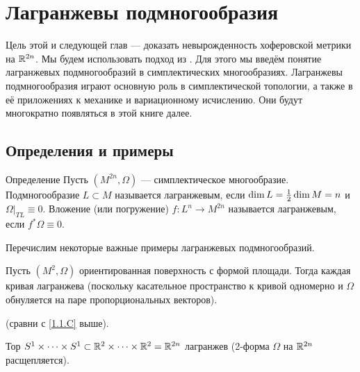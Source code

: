 \chapter{Лагранжевы подмногообразия}\label{chap:3}

Цель этой и следующей глав --- доказать невырожденность хоферовской метрики на $\mathbb{R}^{2n}$.
Мы будем использовать подход из \cite{P1}.
Для этого мы введём понятие лагранжевых подмногообразий в симплектических многообразиях.
Лагранжевы подмногообразия играют основную роль в симплектической топологии, а также в её приложениях к механике и вариационному исчислению.
Они будут многократно появляться в этой книге далее.

\section{Определения и примеры}\label{3.1}

\begin{thm*}{Определение}
Пусть $(M^{2n}, \Omega)$ --- симплектическое многообразие.
Подмногообразие $L \subset M$ называется лагранжевым, если $\dim L \z= \tfrac12 \dim M = n$ и $\Omega|_{TL} \equiv 0$.
Вложение (или погружение) $f\colon L^n \to M^{2n}$ называется лагранжевым, если $f^\ast \Omega \equiv 0$.
\end{thm*}

Перечислим некоторые важные примеры лагранжевых подмногообразий.

\begin{thm}{}\label{3.1.A} 
\end{thm}


Пусть $(M^2, \Omega)$ ориентированная поверхность с формой площади.
Тогда каждая кривая лагранжева (поскольку касательное пространство к кривой одномерно и $\Omega$ обнуляется на паре пропорциональных векторов).

\begin{thm}{}\label{3.1.B} (сравни с \ref{1.1.C} выше).
\end{thm}

Тор $S^1 \times\dots\times S^1
\subset 
\mathbb{R}^2\times\dots\times \mathbb{R}^2 
= 
\mathbb{R}^{2n}$ лагранжев (2-форма $\Omega$ на $\mathbb{R}^{2n}$ расщепляется).


\begin{thm}{}\label{3.1.C}
\end{thm}


